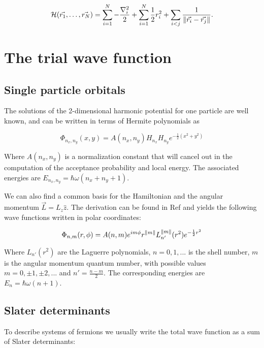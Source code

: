 \begin{equation}
  \mathcal{H}(\vec{r_1},\dots,\vec{r_N}) = \sum_{i=1}^N -\dfrac{\nabla_i^2}{2} + \sum_{i=1}^N \dfrac{1}{2}r_i^2 + \sum_{i<j}\dfrac{1}{{\| \vec{r_i}-\vec{r_j} \|}}.
  \label{Hamiltonian}
\end{equation}

\section{The trial wave function}

\subsection{Single particle orbitals}

The solutions of the 2-dimensional harmonic potential for one particle are well known, and can be written in terms of Hermite polynomials as

\begin{equation}
  \Phi_{n_x,n_y}(x,y)=A(n_x,n_y)H_{n_x}H_{n_y}e^{-\frac{1}{2}(x^2+y^2)}
\end{equation}

Where $A(n_x,n_y)$ is a normalization constant that will cancel out in the computation of the acceptance probability and local energy.
The associated energies are $E_{n_x,n_y}=\hbar\omega(n_x+n_y+1)$.

We can also find a common basis for the Hamiltonian and the angular momentum $\vec{L}=L_z\hat{z}$.
The derivation can be found in Ref\cite{mplhone} and yields the following wave functions written in polar coordinates:

\begin{equation}
  \Phi_{n,m}(r,\phi)=A(n,m)e^{im\phi}r^{{\| m \|}}L_{n'}^{{\| m \|}}(r^2)e^{-\frac{1}{2}r^2}
\end{equation}

Where $L_{n'}(r^2)$ are the Laguerre polynomials, $n=0,1,...$ is the shell number, $m$ is the angular momentum quantum number, with possible values $m=0,\pm1,\pm2,...$ and $n'=\frac{n-m}{2}$.
The corresponding energies are $E_n=\hbar\omega(n+1)$.

\subsection{Slater determinants}

To describe systems of fermions we usually write the total wave function as a sum of Slater determinants:

